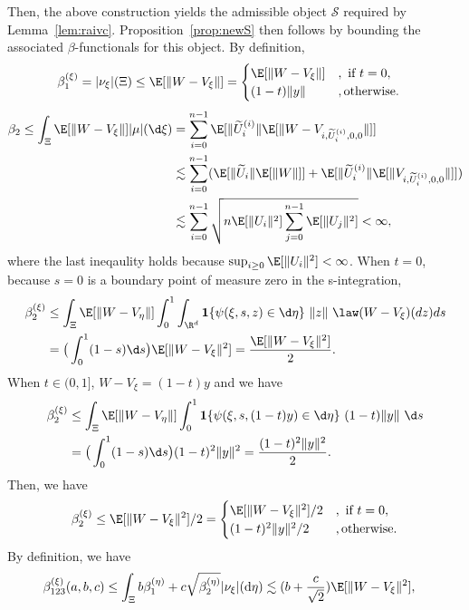 \documentclass[mnsc,nonblindrev]{informs3}
\begin{document}
Then, the above construction yields the admissible object \(\mathcal{S}\) required by Lemma~\ref{lem:raivc}. Proposition~\ref{prop:newS} then follows by bounding the associated \(\beta\)-functionals for this object. By definition,
\begin{align*}
    \beta_1^{(\xi)}&=|\nu_\xi|(\Xi) \leq \E[\|W-V_\xi\|] = \begin{cases}
     \E[\|W-V_\xi\|]&, \text{ if } t = 0,\\
     (1-t)\|y\|&, \text{otherwise.}
    \end{cases}
\end{align*}
\begin{align*}
\beta_{2} \leq  \int_{\Xi}   \E[\|W-V_\xi\|] |\mu|(\d \xi) &= \sum_{i=0}^{n-1}\E[\|\widetilde U_i^{(i)}\|\E[\|W-V_{i,\widetilde U_i^{(i)},0,0}\|]]\\
&\lesssim \sum_{i=0}^{n-1}(\E[\|\widetilde U_i\|\E[\|W\|]]+\E[\|\widetilde U_i^{(i)}\|\E[\|V_{i,\widetilde U_i^{(i)},0,0}\|]])\\
&\lesssim \sum_{i=0}^{n-1}\sqrt{n\E[\|U_i\|^2]\sum_{j=0}^{n-1}\E[\|U_j\|^2]}<\infty,
\end{align*}
where the last ineqaulity holds because $\sup_{i \geq 0}\E[\|U_i\|^2]<\infty$. When $t=0$, because $s=0$ is a boundary point of measure zero in the 
s-integration,
\begin{align*}
\beta_2^{(\xi)}&\leq  \int_{\Xi}\E[\|W-V_\eta\|]\int_0^1\int_{\R^d} \mathbf{1}\{\psi(\xi,s,z)\in \d \eta\}\ \|z\|\ \law(W-V_\xi)(dz)ds\\
&=  \big(\int_{0}^1(1-s)\d s\big)\E[\|W-V_\xi\|^2] = \frac{\E[\|W-V_\xi\|^2]}{2}.
\end{align*}
When $t \in (0,1]$, $W-V_\xi = (1-t)y$ and we have
\begin{align*}
\beta_2^{(\xi)}&\leq \int_{\Xi}\E[\|W-V_\eta\|]\int_0^1 \mathbf{1}\{\psi(\xi,s,(1-t)y)\in \d \eta\}\ (1-t)\|y\|\ \d s\\
&=  \big(\int_{0}^1(1-s)\d s\big)(1-t)^2\|y\|^2 = \frac{(1-t)^2\|y\|^2}{2}.
\end{align*}
Then, we have
\begin{align*}
\beta_2^{(\xi)} \leq \E[\|W-V_\xi\|^2]/2 = \begin{cases}
     \E[\|W-V_\xi\|^2]/2&, \text{ if } t = 0,\\
     (1-t)^2\|y\|^2/2&, \text{otherwise.}
    \end{cases}
\end{align*}
By definition, we have
\begin{align*}
\beta_{123}^{(\xi)}(a, b, c) & \leq \int_{\Xi} b \beta_1^{(\eta)}+c \sqrt{\beta_2^{(\eta)}}|\nu_{\xi}|(\mathrm{d} \eta) \lesssim (b+\frac{c}{\sqrt{2}})\E[\|W-V_\xi\|^2],
\end{align*}
\end{document}
